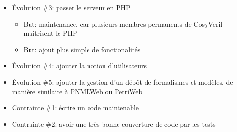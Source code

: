 \documentclass[t, english]{beamer}
\begin{document}
\begin{frame}
{\begin{itemize}
\begin{itemize}
        \item La partie éditeur est en cours de réalisation par un autre
          stagiaire
      \end{itemize}
    \item Évolution \#3: passer le serveur en PHP
      \begin{itemize}
        \item But: maintenance, car plusieurs membres permanents de
          CosyVerif maitrisent le PHP
        \item But: ajout plus simple de fonctionalités
      \end{itemize}
    \item Évolution \#4: ajouter la notion d'utilisateurs
    \item Évolution \#5: ajouter la gestion d'un dépôt de formalismes et
      modèles, de manière similaire à PNMLWeb ou PetriWeb
    \item Contrainte \#1: écrire un code maintenable
    \item Contrainte \#2: avoir une très bonne couverture de code par les
      tests
  \end{itemize}
}
\end{frame}
\end{document}
